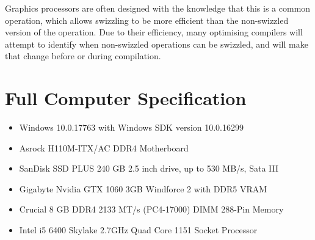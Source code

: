 \documentclass[11pt, a4paper, twocolumn]{article}
\begin{document}
Graphics processors are often designed with the knowledge that this is a common operation, which allows swizzling to be more efficient than the non-swizzled version of the operation. Due to their efficiency, many optimising compilers will attempt to identify when non-swizzled operations can be swizzled, and will make that change before or during compilation.

\section{Full Computer Specification} \label{app:equipment}

\begin{itemize}
\item Windows 10.0.17763 with Windows SDK version 10.0.16299 
\item Asrock H110M-ITX/AC DDR4 Motherboard
\item SanDisk SSD PLUS 240 GB 2.5 inch drive, up to 530 MB/s, Sata III
\item Gigabyte Nvidia GTX 1060 3GB Windforce 2 with DDR5 VRAM
\item Crucial 8 GB DDR4 2133 MT/s (PC4-17000) DIMM 288-Pin Memory
\item Intel i5 6400 Skylake 2.7GHz Quad Core 1151 Socket Processor
\end{itemize}
\end{document}
